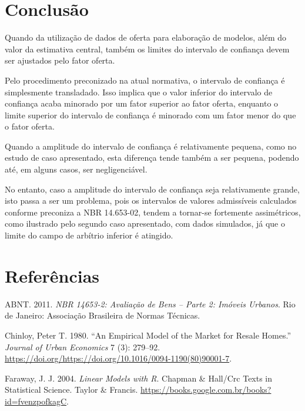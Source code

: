 \documentclass{article}
\begin{document}
\hypertarget{conclusuxe3o}{%
\section{Conclusão}\label{conclusuxe3o}}

Quando da utilização de dados de oferta para elaboração de modelos, além
do valor da estimativa central, também os limites do intervalo de
confiança devem ser ajustados pelo fator oferta.

Pelo procedimento preconizado na atual normativa, o intervalo de
confiança é simplesmente transladado. Isso implica que o valor inferior
do intervalo de confiança acaba minorado por um fator superior ao fator
oferta, enquanto o limite superior do intervalo de confiança é minorado
com um fator menor do que o fator oferta.

Quando a amplitude do intervalo de confiança é relativamente pequena,
como no estudo de caso apresentado, esta diferença tende também a ser
pequena, podendo até, em alguns casos, ser negligenciável.

No entanto, caso a amplitude do intervalo de confiança seja
relativamente grande, isto passa a ser um problema, pois os intervalos
de valores admissíveis calculados conforme preconiza a NBR 14.653-02,
tendem a tornar-se fortemente assimétricos, como ilustrado pelo segundo
caso apresentado, com dados simulados, já que o limite do campo de
arbítrio inferior é atingido.

\hypertarget{referuxeancias}{%
\section*{Referências}\label{referuxeancias}}

\hypertarget{refs}{}
\leavevmode\hypertarget{ref-NBR1465302}{}%
ABNT. 2011. \emph{NBR 14653-2: Avaliação de Bens -- Parte 2: Imóveis
Urbanos}. Rio de Janeiro: Associação Brasileira de Normas Técnicas.

\leavevmode\hypertarget{ref-chinloy}{}%
Chinloy, Peter T. 1980. ``An Empirical Model of the Market for Resale
Homes.'' \emph{Journal of Urban Economics} 7 (3): 279--92.
\url{https://doi.org/https://doi.org/10.1016/0094-1190(80)90001-7}.

\leavevmode\hypertarget{ref-faraway2004linear}{}%
Faraway, J. J. 2004. \emph{Linear Models with R}. Chapman \& Hall/Crc
Texts in Statistical Science. Taylor \& Francis.
\url{https://books.google.com.br/books?id=fvenzpofkagC}.
\end{document}

